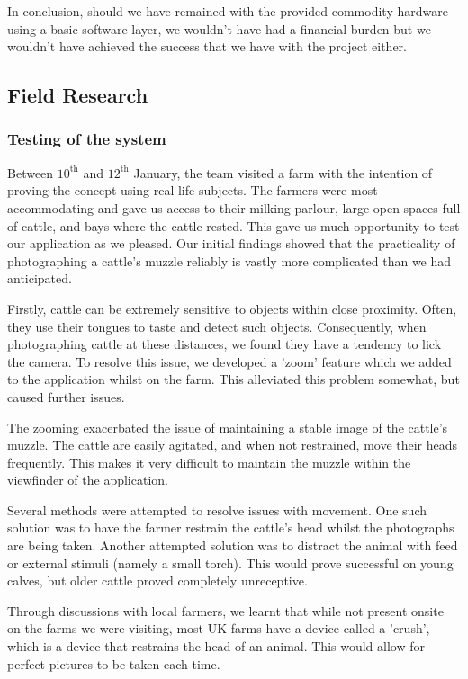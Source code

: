 In conclusion, should we have remained with the provided commodity hardware using a basic software layer, we wouldn't have had a financial burden but we wouldn't have achieved the success that we have with the project either.

\subsection{Field Research}

\subsubsection{Testing of the system}

Between $10^{\text{th}}$ and $12^{\text{th}}$ January, the team visited a farm with the intention of proving the concept using real-life subjects. The farmers were most accommodating and gave us access to their milking parlour, large open spaces full of cattle, and bays where the cattle rested. This gave us much opportunity to test our application as we pleased. Our initial findings showed that the practicality of photographing a cattle's muzzle reliably is vastly more complicated than we had anticipated.

Firstly, cattle can be extremely sensitive to objects within close proximity. Often, they use their tongues to taste and detect such objects. Consequently, when photographing cattle at these distances, we found they have a tendency to lick the camera. To resolve this issue, we developed a 'zoom' feature which we added to the application whilst on the farm. This alleviated this problem somewhat, but caused further issues.

The zooming exacerbated the issue of maintaining a stable image of the cattle's muzzle. The cattle are easily agitated, and when not restrained, move their heads frequently. This makes it very difficult to maintain the muzzle within the viewfinder of the application.

Several methods were attempted to resolve issues with movement. One such solution was to have the farmer restrain the cattle's head whilst the photographs are being taken. Another attempted solution was to distract the animal with feed or external stimuli (namely a small torch). This would prove successful on young calves, but older cattle proved completely unreceptive.

Through discussions with local farmers, we learnt that while not present onsite on the farms we were visiting, most UK farms have a device called a 'crush', which is a device that restrains the head of an animal. This would allow for perfect pictures to be taken each time.

